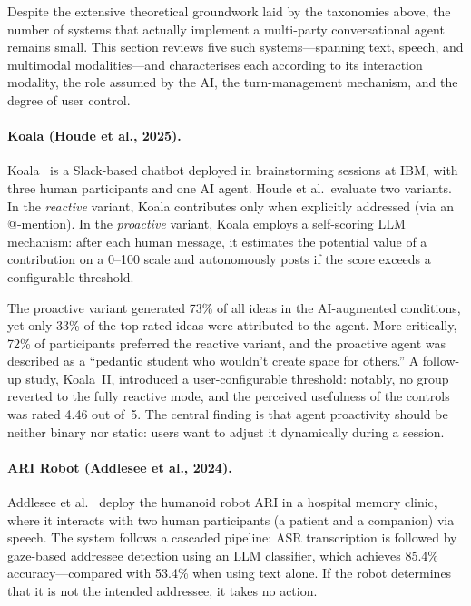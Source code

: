 Despite the extensive theoretical groundwork laid by the taxonomies above, the
number of systems that actually implement a multi-party conversational agent
remains small.  This section reviews five such systems---spanning text, speech,
and multimodal modalities---and characterises each according to its interaction
modality, the role assumed by the AI, the turn-management mechanism, and the
degree of user control.

\paragraph{Koala (Houde et al., 2025).}
Koala~\cite{houde2025koala} is a Slack-based chatbot deployed in brainstorming
sessions at IBM, with three human participants and one AI agent.  Houde et al.\
evaluate two variants.  In the \emph{reactive} variant, Koala contributes only
when explicitly addressed (via an @-mention).  In the \emph{proactive} variant,
Koala employs a self-scoring LLM mechanism: after each human message, it
estimates the potential value of a contribution on a 0--100 scale and
autonomously posts if the score exceeds a configurable threshold.

The proactive variant generated 73\% of all ideas in the AI-augmented
conditions, yet only 33\% of the top-rated ideas were attributed to the agent.
More critically, 72\% of participants preferred the reactive variant, and the
proactive agent was described as a ``pedantic student who wouldn't create space
for others.''  A follow-up study, Koala~II, introduced a user-configurable
threshold: notably, no group reverted to the fully reactive mode, and the
perceived usefulness of the controls was rated 4.46 out of~5.  The central
finding is that agent proactivity should be neither binary nor static: users
want to adjust it dynamically during a session.

\paragraph{ARI Robot (Addlesee et al., 2024).}
Addlesee et al.~\cite{addlesee2024ari} deploy the humanoid robot ARI in a
hospital memory clinic, where it interacts with two human participants (a
patient and a companion) via speech.  The system follows a cascaded pipeline:
ASR transcription is followed by gaze-based addressee detection using an LLM
classifier, which achieves 85.4\% accuracy---compared with 53.4\% when using
text alone.  If the robot determines that it is not the intended addressee, it
takes no action.

